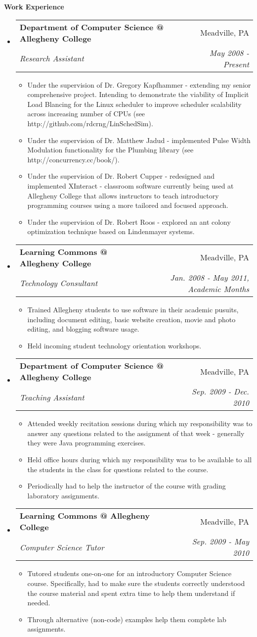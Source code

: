 \documentclass[letterpaper,11pt]{article}
\makeatletter
\newcommand{\resitem}[1]{\item #1 \vspace{-2pt}}
\newcommand{\resheading}[1]{{\large \colorbox{mygrey}{\begin{minipage}{\textwidth}{\textbf{#1 \vphantom{p\^{E}}}}\end{minipage}}}}
\newcommand{\ressubheading}[4]{
\begin{tabular*}{7.0in}{l@{\extracolsep{\fill}}r}
		\textbf{#1} & #2 \\
		\textit{#3} & \textit{#4} \\
\end{tabular*}\vspace{-6pt}}
\makeatother
\begin{document}
\resheading{Work Experience}
\begin{itemize}
\item
	\ressubheading{Department of Computer Science @ Allegheny College}{Meadville, PA}{Research Assistant}{May 2008 - Present}
	\begin{itemize}
	    \resitem{Under the supervision of Dr. Gregory Kapfhammer - extending my senior comprehensive project. Intending to demonstrate the viability of Implicit Load Blancing for the Linux scheduler to improve scheduler scalability across increasing number of CPUs (see http://github.com/rdcrng/LinSchedSim).}
		\resitem{Under the supervision of Dr. Matthew Jadud - implemented Pulse Width Modulation functionality for the Plumbing library (see http://concurrency.cc/book/).}
		\resitem{Under the supervision of Dr. Robert Cupper - redesigned and implemented XInteract - classroom software currently being used at Allegheny College that allows instructors to teach introductory programming courses using a more tailored and focused approach.}
		\resitem{Under the supervision of Dr. Robert Roos - explored an ant colony optimization technique based on Lindenmayer systems.}
	\end{itemize}
	
\item
	\ressubheading{Learning Commons @ Allegheny College}{Meadville, PA}{Technology Consultant}{Jan. 2008 - May 2011, Academic Months}
	\begin{itemize}
		\resitem{Trained Allegheny students to use software in their academic pusuits, including document editing, basic website creation, movie and photo editing, and blogging software usage.}
		\resitem{Held incoming student technology orientation workshops.}
	\end{itemize}

\item
	\ressubheading{Department of Computer Science @ Allegheny College}{Meadville, PA}{Teaching Assistant}{Sep. 2009 - Dec. 2010}
	\begin{itemize}
		\resitem{Attended weekly recitation sessions during which my responsibility was to answer any questions related to the assignment of that week - generally they were Java programming exercises.}
		\resitem{Held office hours during which my responsibility was to be available to all the students in the class for questions related to the course.}
		\resitem{Periodically had to help the instructor of the course with grading laboratory assignments.}
	\end{itemize}

\item
	\ressubheading{Learning Commons @ Allegheny College}{Meadville, PA}{Computer Science Tutor}{Sep. 2009 - May 2010}
	\begin{itemize}
		\resitem{Tutored students one-on-one for an introductory Computer Science course. Specifically, had to make sure the students correctly understood the course material and spent extra time to help them understand if needed. }
		\resitem{Through alternative (non-code) examples help them complete lab assignments.}
	\end{itemize}
	
\end{itemize}
\end{document}
